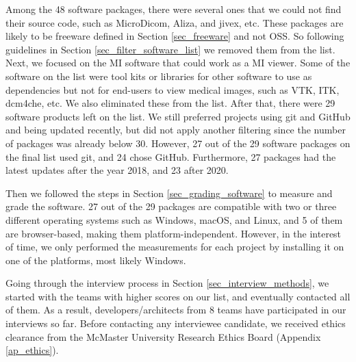 Among the 48 software packages, there were several ones that we could not find their source code, such as MicroDicom, Aliza, and jivex, etc. These packages are likely to be freeware defined in Section \ref{sec_freeware} and not OSS. So following guidelines in Section \ref{sec_filter_software_list} we removed them from the list. Next, we focused on the MI software that could work as a MI viewer. Some of the software on the list were tool kits or libraries for other software to use as dependencies but not for end-users to view medical images, such as VTK, ITK, dcm4che, etc. We also eliminated these from the list. After that, there were 29 software products left on the list. We still preferred projects using git and GitHub and being updated recently, but did not apply another filtering since the number of packages was already below 30. However, 27 out of the 29 software packages on the final list used git, and 24 chose GitHub. Furthermore, 27 packages had the latest updates after the year 2018, and 23 after 2020.

Then we followed the steps in Section \ref{sec_grading_software} to measure and grade the software. 27 out of the 29 packages are compatible with two or three different operating systems such as Windows, macOS, and Linux, and 5 of them are browser-based, making them platform-independent. However, in the interest of time, we only performed the measurements for each project by installing it on one of the platforms, most likely Windows.

Going through the interview process in Section \ref{sec_interview_methods}, we started with the teams with higher scores on our list, and eventually contacted all of them. As a result, developers/architects from 8 teams have participated in our interviews so far. Before contacting any interviewee candidate, we received ethics clearance from the McMaster University Research Ethics Board (Appendix \ref{ap_ethics}).
